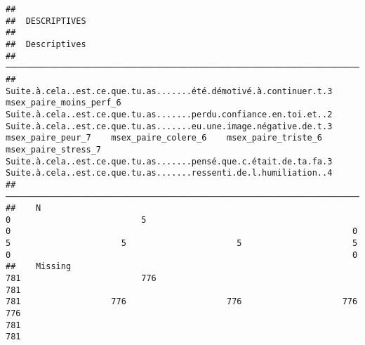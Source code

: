 \documentclass[
]{article}
\begin{document}
\begin{verbatim}
## 
##  DESCRIPTIVES
## 
##  Descriptives                                                                                                                                                                                                                                                                                                                                                                                                                                                                              
##  ───────────────────────────────────────────────────────────────────────────────────────────────────────────────────────────────────────────────────────────────────────────────────────────────────────────────────────────────────────────────────────────────────────────────────────────────────────────────────────────────────────────────────────────────────────────────────────────────────────────────────────────────────────────────────────────────────────────────────────── 
##               Suite.à.cela..est.ce.que.tu.as.......été.démotivé.à.continuer.t.3    msex_paire_moins_perf_6    Suite.à.cela..est.ce.que.tu.as.......perdu.confiance.en.toi.et..2    Suite.à.cela..est.ce.que.tu.as.......eu.une.image.négative.de.t.3    msex_paire_peur_7    msex_paire_colere_6    msex_paire_triste_6    msex_paire_stress_7    Suite.à.cela..est.ce.que.tu.as.......pensé.que.c.était.de.ta.fa.3    Suite.à.cela..est.ce.que.tu.as.......ressenti.de.l.humiliation..4   
##  ───────────────────────────────────────────────────────────────────────────────────────────────────────────────────────────────────────────────────────────────────────────────────────────────────────────────────────────────────────────────────────────────────────────────────────────────────────────────────────────────────────────────────────────────────────────────────────────────────────────────────────────────────────────────────────────────────────────────────────── 
##    N                                                                          0                          5                                                                    0                                                                    0                    5                      5                      5                      5                                                                    0                                                                    0   
##    Missing                                                                  781                        776                                                                  781                                                                  781                  776                    776                    776                    776                                                                  781                                                                  781   

\end{verbatim}
\end{document}

